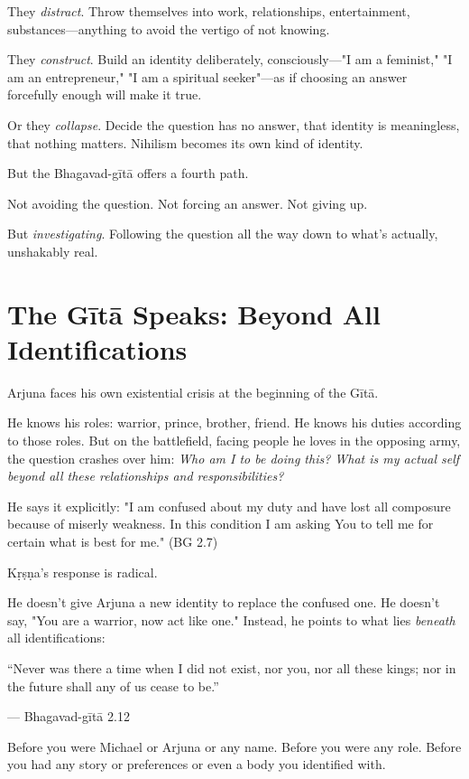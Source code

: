 \documentclass[11pt,twoside]{book}
\begin{document}
They \emph{distract}. Throw themselves into work, relationships, entertainment, substances—anything to avoid the vertigo of not knowing.

They \emph{construct}. Build an identity deliberately, consciously—"I am a feminist," "I am an entrepreneur," "I am a spiritual seeker"—as if choosing an answer forcefully enough will make it true.

Or they \emph{collapse}. Decide the question has no answer, that identity is meaningless, that nothing matters. Nihilism becomes its own kind of identity.

But the Bhagavad-gītā offers a fourth path.

Not avoiding the question. Not forcing an answer. Not giving up.

But \emph{investigating}. Following the question all the way down to what's actually, unshakably real.

\section*{The Gītā Speaks: Beyond All Identifications}

Arjuna faces his own existential crisis at the beginning of the Gītā.

He knows his roles: warrior, prince, brother, friend. He knows his duties according to those roles. But on the battlefield, facing people he loves in the opposing army, the question crashes over him: \emph{Who am I to be doing this? What is my actual self beyond all these relationships and responsibilities?}

He says it explicitly: "I am confused about my duty and have lost all composure because of miserly weakness. In this condition I am asking You to tell me for certain what is best for me." (BG 2.7)

Kṛṣṇa's response is radical.

He doesn't give Arjuna a new identity to replace the confused one. He doesn't say, "You are a warrior, now act like one." Instead, he points to what lies \emph{beneath} all identifications:

\begin{pullquote}
``Never was there a time when I did not exist, nor you, nor all these kings; nor in the future shall any of us cease to be.''

--- Bhagavad-gītā 2.12
\end{pullquote}

Before you were Michael or Arjuna or any name. Before you were any role. Before you had any story or preferences or even a body you identified with.
\end{document}
